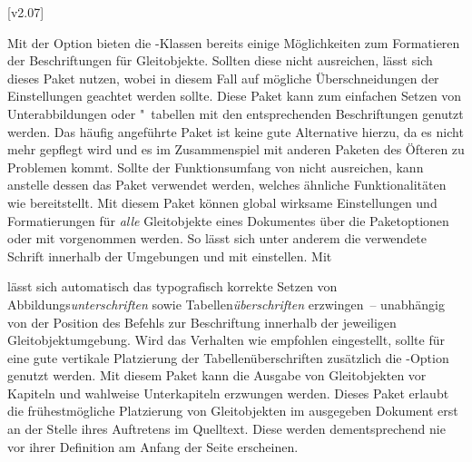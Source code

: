 [v2.07]
%
%
\begin{DeclarePackages}
  Mit der Option  bieten die 
  \KOMAScript-Klassen bereits einige Möglichkeiten zum Formatieren der 
  Beschriftungen für Gleitobjekte. Sollten diese nicht ausreichen, lässt sich 
  dieses Paket nutzen, wobei in diesem Fall auf mögliche Überschneidungen der 
  Einstellungen geachtet werden sollte.
  Diese Paket kann zum einfachen Setzen von Unterabbildungen oder "~tabellen 
  mit den entsprechenden Beschriftungen genutzt werden. Das häufig angeführte 
  Paket  ist keine gute Alternative hierzu, da es nicht mehr 
  gepflegt wird und es im Zusammenspiel mit anderen Paketen des Öfteren zu 
  Problemen kommt. Sollte der Funktionsumfang von  nicht 
  ausreichen, kann anstelle dessen das Paket  verwendet 
  werden, welches ähnliche Funktionalitäten wie  bereitstellt.
  Mit diesem Paket können global wirksame Einstellungen und Formatierungen für 
  \emph{alle} Gleitobjekte eines Dokumentes über die Paketoptionen oder mit 
   vorgenommen werden. So lässt sich unter 
  anderem die verwendete Schrift innerhalb der Umgebungen  
  und  mit  
  einstellen. Mit 
  \begin{Code}
  \end{Code}\vspace{-\baselineskip}%
  lässt sich automatisch das typografisch korrekte Setzen von 
  Abbildungs\emph{unterschriften} sowie Tabellen\emph{überschriften} 
  erzwingen~-- unabhängig von der Position des Befehls zur Beschriftung 
   innerhalb der jeweiligen Gleitobjektumgebung. Wird das 
  Verhalten wie empfohlen eingestellt, sollte für eine gute vertikale 
  Platzierung der Tabellenüberschriften zusätzlich die \KOMAScript-Option 
   genutzt werden.
  Mit diesem Paket kann die Ausgabe von Gleitobjekten vor Kapiteln und wahlweise
  Unterkapiteln erzwungen werden.
  Dieses Paket erlaubt die frühestmögliche Platzierung von Gleitobjekten im 
  ausgegeben Dokument erst an der Stelle ihres Auftretens im Quelltext. Diese 
  werden dementsprechend nie vor ihrer Definition am Anfang der Seite 
  erscheinen.
\end{DeclarePackages}
%



